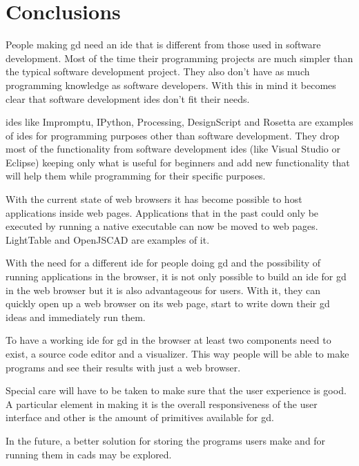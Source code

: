\documentclass{./llncs2e/llncs}
\begin{document}
	

\section{Conclusions}
	People making \ac{gd} need an \ac{ide} that is different from those used in software development. 
	Most of the time their programming projects are much simpler than the typical software development project.
	They also don't have as much programming knowledge as software developers.
	With this in mind it becomes clear that software development \ac{ide}s don't fit their needs.
	
	\ac{ide}s like Impromptu, IPython, Processing, DesignScript and Rosetta are examples of \ac{ide}s for programming purposes other than software development.
	They drop most of the functionality from software development \ac{ide}s (like Visual Studio or Eclipse) keeping only what is useful for beginners and add new functionality that will help them while programming for their specific purposes.
	
	With the current state of web browsers it has become possible to host applications inside web pages. 
	Applications that in the past could only be executed by running a native executable can now be moved to web pages.
	LightTable and OpenJSCAD are examples of it.
	
	With the need for a different \ac{ide} for people doing \ac{gd} and the possibility of running applications in the browser, it is not only possible to build an \ac{ide} for \ac{gd} in the web browser but it is also advantageous for users.
	With it, they can quickly open up a web browser on its web page, start to write down their \ac{gd} ideas and immediately run them.
	
	To have a working \ac{ide} for \ac{gd} in the browser at least two components need to exist, a source code editor and a visualizer.
	This way people will be able to make programs and see their results with just a web browser.
	
	Special care will have to be taken to make sure that the user experience is good. 
	A particular element in making it is the overall responsiveness of the user interface and other is the amount of primitives available for \ac{gd}.
	
	In the future, a better solution for storing the programs users make and for running them in \ac{cad}s may be explored.
	
\newpage
\end{document}
